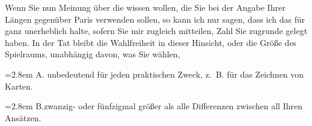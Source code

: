 \par\noindent\hspace*{\parindent}Wenn Sie nun  Meinung über die  wissen wollen, die Sie bei der Angabe Ihrer Längen gegenüber Paris verwenden sollen, so kann ich nur sagen, dass ich das für ganz unerheblich halte, sofern Sie mir zugleich mitteilen,  Zahl Sie zugrunde gelegt haben. In der Tat bleibt die Wahlfreiheit in dieser Hinsicht, oder die Größe des Spielraums, unabhängig davon, was Sie wählen,
\par\noindent\hspace*{\parindent}\hangindent=2.8em A.\quad {} unbedeutend für jeden praktischen Zweck, z.~B. für das Zeichnen von Karten.
\par\noindent\hspace*{\parindent}\hangindent=2.8em B.\quad zwanzig- oder fünfzigmal größer als alle  Differenzen zwischen all Ihren Ansätzen.

